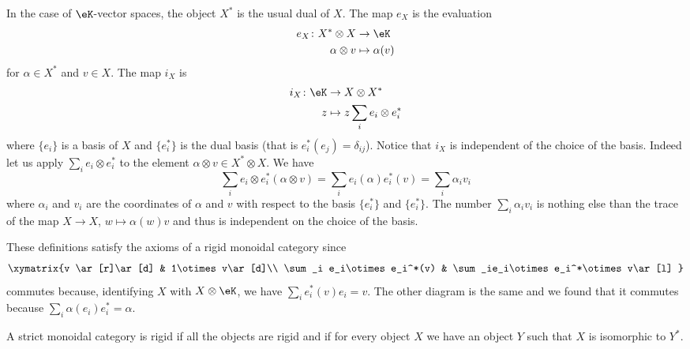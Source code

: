 \begin{example}
	In the case of \( \eK\)-vector spaces, the object \( X^*\) is the usual dual of \( X\). The map \( e_X\) is the evaluation
	\begin{equation}
		\begin{aligned}
			e_X\colon X^*\otimes X & \to \eK           \\
			\alpha\otimes v        & \mapsto \alpha(v)
		\end{aligned}
	\end{equation}
	for \( \alpha\in X^*\) and \( v\in X\). The map \( i_X\) is
	\begin{equation}
		\begin{aligned}
			i_X\colon \eK & \to X\otimes X^*                 \\
			z             & \mapsto z\sum_i e_i\otimes e^*_i
		\end{aligned}
	\end{equation}
	where \( \{ e_i \}\) is a basis of \( X\) and \( \{ e_i^* \} \) is the dual basis (that is \( e_i^*(e_j)=\delta_{ij}\)). Notice that \( i_X\) is independent of the choice of the basis. Indeed let us apply \( \sum_ie_i\otimes e_i^*\) to the element \( \alpha\otimes v\in X^*\otimes X\). We have
	\begin{equation}
		\sum_ie_i\otimes e_i^*(\alpha\otimes v)=\sum_ie_i(\alpha)e_i^*(v)=\sum_i\alpha_i v_i
	\end{equation}
	where \( \alpha_i\) and \( v_i\) are the coordinates of \( \alpha\) and \( v\) with respect to the basis \( \{ e_i^* \}\) and \( \{ e_i^* \}\). The number \( \sum_i\alpha_iv_i\) is nothing else than the trace of the map \( X\to X\), \( w\mapsto\alpha(w)v\) and thus is independent on the choice of the basis.

	These definitions satisfy the axioms of a rigid monoidal category since
	\begin{equation}
		\xymatrix{%
			v \ar[r]\ar[d]        &   1\otimes v\ar[d]\\
			\sum_i e_i\otimes e_i^*(v)   &   \sum_ie_i\otimes e_i^*\otimes v\ar[l]
		}
	\end{equation}
	commutes because, identifying \( X\) with \( X\otimes\eK\), we have \( \sum_ie_i^*(v)e_i=v\). The other diagram is the same and we found that it commutes because \( \sum_i\alpha(e_i)e_i^*=\alpha\).
\end{example}

A strict monoidal category is rigid if all the objects are rigid and if for every object \( X\) we have an object \( Y\) such that \( X\) is isomorphic to \( Y^*\).

